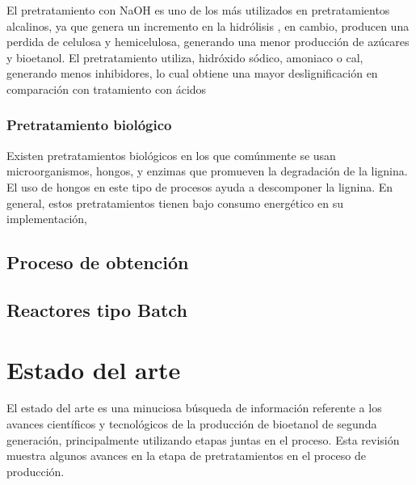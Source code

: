 \documentclass[12pt]{article}
\begin{document}
El pretratamiento con NaOH es uno de los más utilizados en pretratamientos alcalinos,  ya que genera un incremento en la hidrólisis \cite{espinosa2021pretratamiento}, en cambio, producen una perdida de celulosa y hemicelulosa, generando una menor producción de azúcares y bioetanol.
El pretratamiento utiliza, hidróxido sódico, amoniaco o cal, generando menos inhibidores, lo cual obtiene una mayor deslignificación en comparación con tratamiento con ácidos %

\subsubsection{Pretratamiento biológico }

Existen pretratamientos biológicos en los que comúnmente se usan microorganismos, hongos, y enzimas que promueven la degradación de la lignina. El uso de hongos en este tipo de procesos ayuda a descomponer la lignina. En general, estos pretratamientos tienen bajo consumo energético en su implementación, %

\subsection{Proceso de obtención }


\subsection{Reactores tipo Batch }





	
	
		\section{Estado del arte}

	\label{Estado del arte}
El estado del arte es una minuciosa búsqueda de información referente a los avances científicos y tecnológicos de la producción de bioetanol de segunda generación, principalmente utilizando etapas juntas en el proceso. Esta revisión muestra algunos avances en la etapa de pretratamientos en el proceso de producción.
\end{document}

